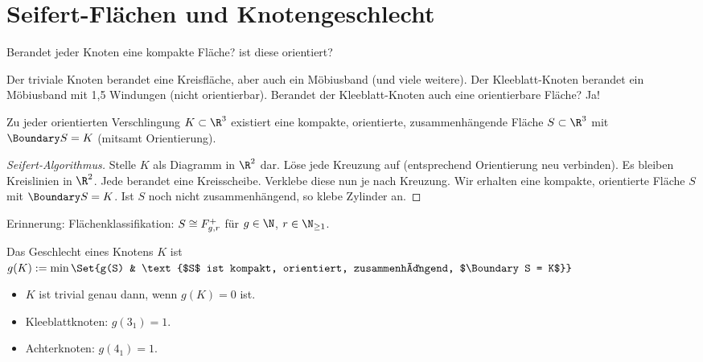 \section{Seifert-Flächen und Knotengeschlecht}

Berandet jeder Knoten eine kompakte Fläche? ist diese orientiert?

Der triviale Knoten berandet eine Kreisfläche, aber auch ein Möbiusband (und viele weitere).
Der Kleeblatt-Knoten berandet ein Möbiusband mit 1,5 Windungen (nicht orientierbar).
Berandet der Kleeblatt-Knoten auch eine orientierbare Fläche? Ja!

\begin{st}
    Zu jeder orientierten Verschlingung $K \subset \R^3$ existiert eine kompakte, orientierte, zusammenhängende Fläche $S \subset \R^3$ mit $\Boundary S = K$ (mitsamt Orientierung).
    \begin{proof}[Seifert-Algorithmus]
        Stelle $K$ als Diagramm in $\R^2$ dar.
        Löse jede Kreuzung auf (entsprechend Orientierung neu verbinden).
        Es bleiben Kreislinien in $\R^2$.
        Jede berandet eine Kreisscheibe.
        Verklebe diese nun je nach Kreuzung.
        Wir erhalten eine kompakte, orientierte Fläche $S$ mit $\Boundary S = K$.
        Ist $S$ noch nicht zusammenhängend, so klebe Zylinder an.
    \end{proof}
\end{st}

Erinnerung: Flächenklassifikation:
\begin{math}
    S \cong F_{g,r}^+
\end{math}
für $g \in \N$, $r \in \N_{\ge 1}$.

\begin{df}
    Das Geschlecht eines Knotens $K$ ist
    \begin{math}
        g(K) := \min \Set{g(S) & \text{$S$ ist kompakt, orientiert, zusammenhängend, $\Boundary S = K$}}
    \end{math}
\end{df}

\begin{note}
    \begin{itemize}
        \item
            $K$ ist trivial genau dann, wenn $g(K) = 0$ ist.
        \item
            Kleeblattknoten: $g(3_1) = 1$.
        \item
            Achterknoten: $g(4_1) = 1$.
    \end{itemize}
\end{note}




